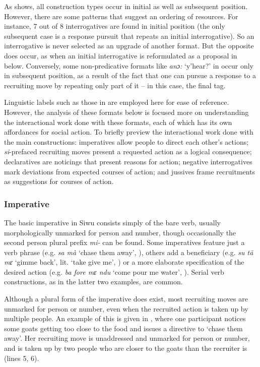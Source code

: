 \documentclass[output=paper]{langsci/langscibook}
\begin{document}
As  shows, all construction types occur in initial as well as subsequent position. However, there are some patterns that suggest an ordering of resources. For instance, 7 out of 8 interrogatives are found in initial position (the only subsequent case is a response pursuit that repeats an initial interrogative). So an interrogative is never selected as an upgrade of another format. But the opposite does occur, as when an initial interrogative is reformulated as a proposal in  below. Conversely, some non-predicative formats like \textit{anɔ:} ‘y’hear?’ in  occur only in subsequent position, as a result of the fact that one can pursue a response to a recruiting move by repeating only part of it -- in this case, the final tag.

Linguistic labels such as those in  are employed here for ease of reference. However, the analysis of these formats below is focused more on understanding the interactional work done with these formats, each of which has its own affordances for social action. To briefly preview the interactional work done with the main constructions: imperatives allow people to direct each other’s actions; \textit{si}-prefaced recruiting moves present a requested action as a logical consequence; declaratives are noticings that present reasons for action; negative interrogatives mark deviations from expected courses of action; and jussives frame recruitments as suggestions for courses of action.

\subsubsection{Imperative}

The basic imperative in Siwu consists simply of the bare verb, usually morphologically unmarked for person and number, though occasionally the second person plural prefix \textit{mi-} can be found. Some imperatives feature just a verb phrase (e.g. \textit{sa mà} ‘chase them away’, ), others add a beneficiary (e.g. \textit{su tã mɛ} ‘gimme back’, lit. ‘take give me’, ) or a more elaborate specification of the desired action (e.g. \textit{ba fore mɛ ndu} ‘come pour me water’, ). Serial verb constructions, as in the latter two examples, are common.

Although a plural form of the imperative does exist, most recruiting moves are unmarked for person or number, even when the recruited action is taken up by multiple people. An example of this is given in  , where one participant notices some goats getting too close to the food and issues a directive to ‘chase them away’. Her recruiting move is unaddressed and unmarked for person or number, and is taken up by two people who are closer to the goats than the recruiter is (lines 5, 6).
\end{document}
